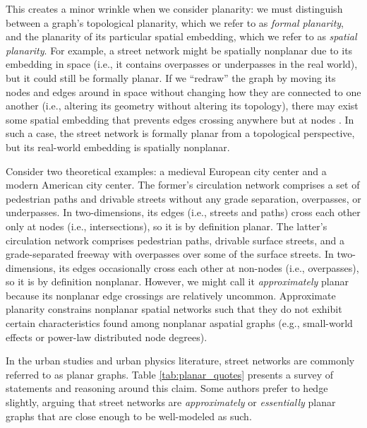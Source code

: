 \documentclass[Afour,sageh,times]{sagej}
\begin{document}
This creates a minor wrinkle when we consider planarity: we must distinguish between a graph's topological planarity, which we refer to as \emph{formal planarity}, and the planarity of its particular spatial embedding, which we refer to as \emph{spatial planarity}. For example, a street network might be spatially nonplanar due to its embedding in space (i.e., it contains overpasses or underpasses in the real world), but it could still be formally planar. If we \enquote{redraw} the graph by moving its nodes and edges around in space without changing how they are connected to one another (i.e., altering its geometry without altering its topology), there may exist some spatial embedding that prevents edges crossing anywhere but at nodes \citep[for a comprehensive discussion see][pp.~6--10]{barthelemy_morphogenesis_2017}. In such a case, the street network is formally planar from a topological perspective, but its real-world embedding is spatially nonplanar.

Consider two theoretical examples: a medieval European city center and a modern American city center. The former's circulation network comprises a set of pedestrian paths and drivable streets without any grade separation, overpasses, or underpasses. In two-dimensions, its edges (i.e., streets and paths) cross each other only at nodes (i.e., intersections), so it is by definition planar. The latter's circulation network comprises pedestrian paths, drivable surface streets, and a grade-separated freeway with overpasses over some of the surface streets. In two-dimensions, its edges occasionally cross each other at non-nodes (i.e., overpasses), so it is by definition nonplanar. However, we might call it \emph{approximately} planar because its nonplanar edge crossings are relatively uncommon. Approximate planarity constrains nonplanar spatial networks such that they do not exhibit certain characteristics found among nonplanar aspatial graphs (e.g., small-world effects or power-law distributed node degrees).

In the urban studies and urban physics literature, street networks are commonly referred to as planar graphs. Table \ref{tab:planar_quotes} presents a survey of statements and reasoning around this claim. Some authors prefer to hedge slightly, arguing that street networks are \emph{approximately} or \emph{essentially} planar graphs that are close enough to be well-modeled as such.
\end{document}
